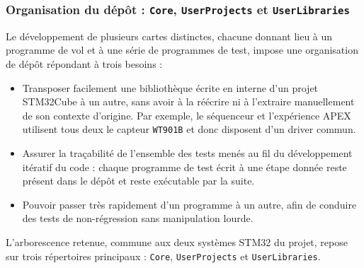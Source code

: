 \newpage

\subsubsection{Organisation du dépôt : \texttt{Core}, \texttt{UserProjects} et \texttt{UserLibraries}}

Le développement de plusieurs cartes distinctes, chacune donnant lieu à un programme de vol et à une série de programmes de
test, impose une organisation de dépôt répondant à trois besoins :\\
\begin{itemize}
    \item Transposer facilement une bibliothèque écrite en interne d'un projet STM32Cube à un autre, sans avoir à la réécrire ni
    à l'extraire manuellement de son contexte d'origine. Par exemple, le séquenceur et l'expérience APEX utilisent tous deux le
    capteur \texttt{WT901B} et donc disposent d'un driver commun.\\
    \item Assurer la traçabilité de l'ensemble des tests menés au fil du développement itératif du code : chaque programme de
    test écrit à une étape donnée reste présent dans le dépôt et reste exécutable par la suite.\\
    \item Pouvoir passer très rapidement d'un programme à un autre, afin de conduire des tests de non-régression sans
    manipulation lourde.\\
\end{itemize}
L'arborescence retenue, commune aux deux systèmes STM32 du projet, repose sur trois répertoires principaux : \texttt{Core},
\texttt{UserProjects} et \texttt{UserLibraries}.

\vfill

